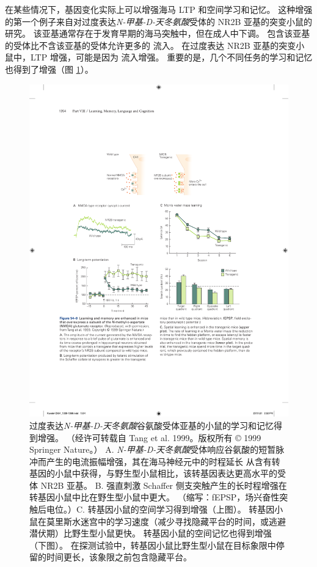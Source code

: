 在某些情况下，基因变化实际上可以增强海马 LTP 和空间学习和记忆。
这种增强的第一个例子来自对过度表达\textit{N-甲基-D-天冬氨酸}受体的 NR2B 亚基的突变小鼠的研究。
该亚基通常存在于发育早期的海马突触中，但在成人中下调。
包含该亚基的受体比不含该亚基的受体允许更多的  流入。
在过度表达 NR2B 亚基的突变小鼠中，LTP 增强，可能是因为  流入增强。
重要的是，几个不同任务的学习和记忆也得到了增强（图 \ref{fig:54_8}）。


\begin{figure}[htbp]
	\centering
	\includegraphics[width=0.75\linewidth]{chap54/fig_54_8}
	\caption{过度表达\textit{N-甲基-D-天冬氨酸}谷氨酸受体亚基的小鼠的学习和记忆得到增强。 （经许可转载自 Tang et al. 1999。版权所有 © 1999 Springer Nature。） A. \textit{N-甲基-D-天冬氨酸}受体响应谷氨酸的短暂脉冲而产生的电流振幅增强，其在海马神经元中的时程延长 从含有转基因的小鼠中获得，与野生型小鼠相比，该转基因表达更高水平的受体 NR2B 亚基。 B. 强直刺激 Schaffer 侧支突触产生的长时程增强在转基因小鼠中比在野生型小鼠中更大。 （缩写：fEPSP，场兴奋性突触后电位。）C. 转基因小鼠的空间学习得到增强（上图）。 转基因小鼠在莫里斯水迷宫中的学习速度（减少寻找隐藏平台的时间，或逃避潜伏期）比野生型小鼠更快。 转基因小鼠的空间记忆也得到增强（下图）。 在探测试验中，转基因小鼠比野生型小鼠在目标象限中停留的时间更长，该象限之前包含隐藏平台。}
	\label{fig:54_8}
\end{figure}


